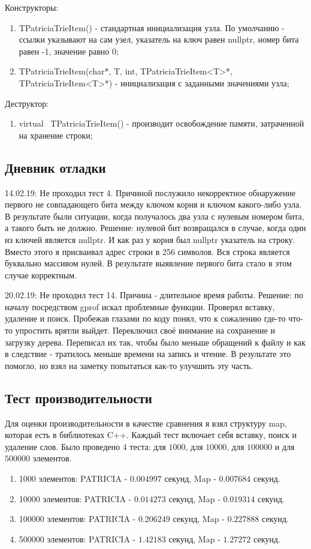 \documentclass[12pt]{article}
\begin{document}
Конструкторы:
\begin{enumerate}
	\item TPatriciaTrieItem() - стандартная инициализация узла. По умолчанию - ссылки указывают на сам узел, указатель на ключ равен nullptr, номер бита равен -1, значение равно 0;
	\item TPatriciaTrieItem(char*, T, int, TPatriciaTrieItem<T>*, TPatriciaTrieItem<T>*) - инициализация с заданными значениями узла;
\end{enumerate}

Деструктор:
\begin{enumerate}
	\item virtual ~TPatriciaTrieItem() - производит освобождение памяти, затраченной на хранение строки;
\end{enumerate}

\subsection*{Дневник отладки}

14.02.19: Не проходил тест 4. Причиной послужило некорректное обнаружение первого не совпадающего бита между ключом корня и ключом какого-либо узла. В результате были ситуации, когда получалось два узла с нулевым номером бита, а такого быть не должно. Решение: нулевой бит возвращался в случае, когда один из ключей является nullptr. И как раз у корня был nullptr указатель на строку. Вместо этого я присваивал адрес строки в 256 символов. Вся строка является буквально массивом нулей. В результате выявление первого бита стало в этом случае корректным.

20.02.19: Не проходил тест 14. Причина - длительное время работы. Решение: по началу посредством gprof искал проблемные функции. Проверял вставку, удаление и поиск. Пробежав глазами по коду понял, что к сожалению где-то что-то упростить врятли выйдет. Переключил своё внимание на сохранение и загрузку дерева. Переписал их так, чтобы было меньше обращений к файлу и как в следствие - тратилось меньше времени на запись и чтение. В результате это помогло, но взял на заметку попытаться как-то улучшить эту часть.

\subsection*{Тест производительности}

Для оценки производительности в качестве сравнения я взял структуру map, которая есть в библиотеках C++.
Каждый тест включает себя вставку, поиск и удаление слов.
Было проведено 4 теста: для $1000$, для $10000$, для $100000$ и для $500000$ элементов.
\begin{enumerate}
	\item 1000 элементов: PATRICIA - $0.004997$ секунд, Map - $0.007684$ секунд.
	\item 10000 элементов: PATRICIA - $0.014273$ секунд, Map - $0.019314$ секунд.
	\item 100000 элементов: PATRICIA - $0.206249$ секунд, Map - $0.227888$ секунд.
	\item 500000 элементов: PATRICIA - $1.42183$ секунд, Map - $1.27272$ секунд.
\end{enumerate}
	
\end{document}
